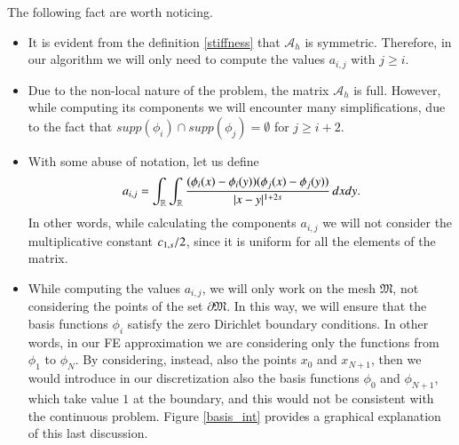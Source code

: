 \begin{remark}\label{rem_prel}
The following fact are worth noticing.
\begin{itemize}
	\item It is evident from the definition \eqref{stiffness} that $\mathcal A_h$ is symmetric. Therefore, in our algorithm we will only need to compute the values $a_{i,j}$ with $j\geq i$.
	
	\item Due to the non-local nature of the problem, the matrix $\mathcal A_h$ is full. However, while computing its components we will encounter many simplifications, due to the fact that $supp(\phi_i)\cap supp(\phi_j) =\emptyset$ for $j\geq i+2$.
	
	\item With some abuse of notation, let us define 
	\begin{align}\label{stiffness_nc}
	a_{i,j}= \int_{\mathbb{R}}\int_{\mathbb{R}}\frac{(\phi_i(x)-\phi_i(y))(\phi_j(x)-\phi_j(y))}{|x-y|^{1+2s}}\,dxdy.
\end{align}
	In other words, while calculating the components $a_{i,j}$ we will not consider the multiplicative constant $c_{1,s}/2$, since it is uniform for all the elements of the matrix. 
	
	\item While computing the values $a_{i,j}$, we will only work on the mesh $\mathfrak{M}$, not considering the points of the set $\partial\mathfrak{M}$. In this way, we will ensure that the basis functions $\phi_i$ satisfy the zero Dirichlet boundary conditions. In other words, in our FE approximation we are considering only the functions from $\phi_1$ to $\phi_N$. By considering, instead, also the points $x_0$ and $x_{N+1}$, then we would introduce in our discretization also the basis functions $\phi_0$ and $\phi_{N+1}$, which take value $1$ at the boundary, and this would not be consistent with the continuous problem. Figure \ref{basis_int} provides a graphical explanation of this last discussion.      	
\end{itemize}
\end{remark}

